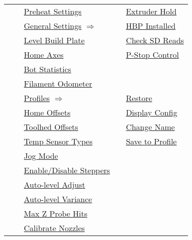 {\begin{table}[!hb]
\begin{tabular}{lllll}
&& \cellcolor{LightBlue} \hyperref[sec:preheatset]{Preheat Settings} && \cellcolor{LightCyan} \hyperref[sec:extruder-hold]{Extruder Hold} \\
\hhline{~~|-|-|-|}
&& \multicolumn{2}{l}{\cellcolor{LightCyan} \hyperref[sec:general]{General Settings} \hfil\phantom{mmm} \hfil $\Longrightarrow$} & \cellcolor{LightCyan} \hyperref[sec:hbp-present]{HBP Installed} \\
\hhline{~~|-|-|-|}
&& \cellcolor{LightBlue} \hyperref[sec:levelbp]{Level Build Plate} && \cellcolor{LightCyan} \hyperref[sec:sd-crc]{Check SD Reads} \\
\hhline{~~|-|~|-|}
&& \cellcolor{LightCyan} \hyperref[sec:home-axes]{Home Axes} && \cellcolor{LightCyan} \hyperref[sec:pstop-enable]{P-Stop Control} \\
\hhline{~~|-|~|-}
&& \cellcolor{LightBlue} \hyperref[sec:bot-stats]{Bot Statistics} \\
\hhline{~~|-|~~}
&& \cellcolor{LightCyan} \hyperref[sec:filodo]{Filament Odometer} \\
\hhline{~~|-|-|-|}
&& \multicolumn{2}{l}{\cellcolor{LightBlue} \hyperref[sec:profiles]{Profiles} \hfil\phantom{nmmmmmmm} \hfil $\Longrightarrow$} & \cellcolor{LightBlue} \hyperref[sec:profiles-r]{Restore} \\
\hhline{~~|-|-|-|}
&& \cellcolor{LightCyan} \hyperref[sec:homeoff]{Home Offsets} && \cellcolor{LightBlue} \hyperref[sec:profiles-dc]{Display Config} \\
\hhline{~~|-|~|-|}
&& \cellcolor{LightBlue} \hyperref[sec:tooloff]{Toolhed Offsets} && \cellcolor{LightBlue} \hyperref[sec:profiles-cn]{Change Name} \\
\hhline{~~|-|~|-|}
&& \cellcolor{LightCyan} \hyperref[sec:tempsensor]{Temp Sensor Types} && \cellcolor{LightBlue} \hyperref[sec:profiles-sp]{Save to Profile} \\
\hhline{~~|-|~|-|}
&& \cellcolor{LightBlue} \hyperref[sec:jog]{Jog Mode} \\
\hhline{~~|-|~~}
&& \cellcolor{LightCyan} \hyperref[sec:steppers-enable]{Enable/Disable Steppers} \\
\hhline{~~|-|~~}
&& \cellcolor{LightBlue} \hyperref[sec:alevel-adj]{Auto-level Adjust} \\
\hhline{~~|-|~~}
&& \cellcolor{LightCyan} \hyperref[sec:alevel-variance]{Auto-level Variance} \\
\hhline{~~|-|~~}
&& \cellcolor{LightBlue} \hyperref[sec:alevel-maxhits]{Max Z Probe Hits} \\
\hhline{~~|-|~~}
&& \cellcolor{LightCyan} \hyperref[sec:calibnozz]{Calibrate Nozzles} \\

\end{tabular}
\end{table}}
